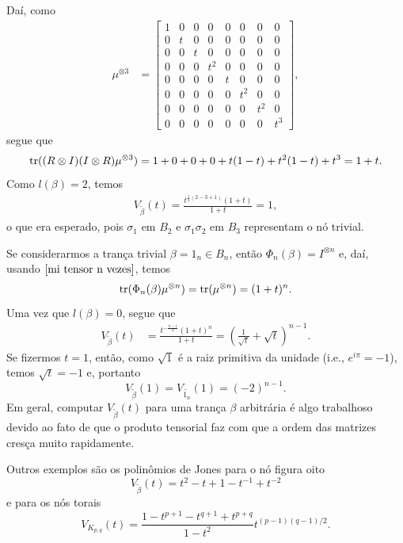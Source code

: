 	Daí, como
	\begin{align*}
	    \mu^{\otimes 3} &= \begin{bmatrix}
	    1 & 0 & 0 & 0 & 0 & 0 & 0 & 0 \\
	    0 & t & 0 & 0 & 0 & 0 & 0 & 0 \\
	    0 & 0 & t & 0 & 0 & 0 & 0 & 0 \\
	    0 & 0 & 0 & t^2 & 0 & 0 & 0 & 0 \\
	    0 & 0 & 0 & 0 & t & 0 & 0 & 0 \\
	    0 & 0 & 0 & 0 & 0 & t^2 & 0 & 0 \\
	    0 & 0 & 0 & 0 & 0 & 0 & t^2 & 0 \\
	    0 & 0 & 0 & 0 & 0 & 0 & 0 & t^3
	    \end{bmatrix},    
	\end{align*}
	segue que
	\begin{align*}
	    \operatorname{tr}((R\otimes I)(I\otimes R)\mu^{\otimes 3}) = 1 + 0 + 0 + 0 + t(1-t) + t^2(1-t) + t^3 = 1 + t.
	\end{align*}
	Como $l(\beta) = 2$, temos
	\begin{align*}
	    V_{\widetilde{\beta}}(t) = \frac{t^{\frac{1}{2}(2-3+1)} (1+t)}{1+t} = 1,
	\end{align*}
	o que era esperado, pois $\sigma_1$ em $B_2$ e $\sigma_1\sigma_2$ em $B_3$ representam o nó trivial.
	
	\par\vspace{0.3cm} Se considerarmos a trança trivial $\beta =1_n\in B_n$, então 
	$\Phi_n(\beta) = I^{\otimes n}$ e, daí, usando $\eqref{mi tensor n vezes}$, temos
	\begin{equation*}
	    \operatorname{tr}( \Phi_n(\beta)\mu^{\otimes n} ) = \operatorname{tr}(\mu^{\otimes n}) = (1+t)^n.
	\end{equation*} 
	Uma vez que $l(\beta) = 0$, segue que
	\begin{align*}
	    V_{\widetilde{\beta}}(t) &= \frac{t^{-\frac{n-1}{2}} (1+t)^n}{1+t}
	    = \left( \frac{1}{\sqrt{t}} + \sqrt{t} \right)^{n-1}.
	\end{align*}
	Se fizermos $t=1$, então, como $\sqrt{1}$ é a raiz primitiva da unidade (i.e., $e^{i\pi} = -1$), 
	temos $\sqrt{t} = -1$ e, portanto
	\begin{equation}
	\label{polinomio de jones tranca trivial}
	    V_{\widetilde{\beta}}(1) = V_{\widetilde{1_n}}(1) = (-2)^{n-1}.
	\end{equation}
	Em geral, computar $V_{\widetilde{\beta}}(t)$ para uma trança $\beta$ arbitrária é algo trabalhoso
	devido ao fato de que o produto tensorial faz com que a ordem das matrizes cresça muito rapidamente.
	\begin{example}
    	Outros exemplos são os polinômios de Jones para o nó figura oito 
    	\begin{equation*}
    	    V_{\widetilde{\beta}}(t) = t^2 - t + 1 - t^{-1} + t^{-2}  
    	\end{equation*}
    	e para os nós torais
    	\begin{equation*}
    	    V_{K_{p,q}}(t) = \frac{1-t^{p+1}-t^{q+1} + t^{p+q}}{1-t^2}t^{(p-1)(q-1)/2}.
    	\end{equation*}
	\end{example}
